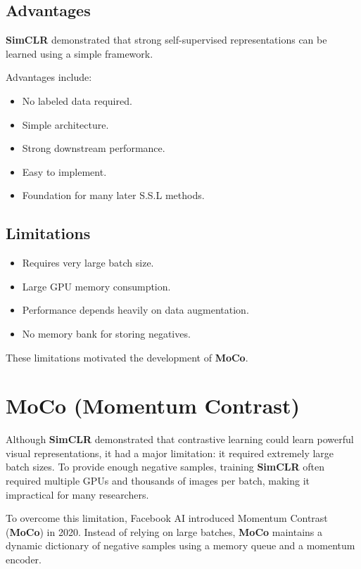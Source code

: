\subsection{Advantages}

\textbf{SimCLR} demonstrated that strong self-supervised representations can be learned using a simple framework.

Advantages include:
\begin{itemize}
    \item No labeled data required.
    \item Simple architecture.
    \item Strong downstream performance.
    \item Easy to implement.
    \item Foundation for many later S.S.L methods.
\end{itemize}

\subsection{Limitations}

\begin{itemize}
    \item Requires very large batch size.
    \item Large GPU memory consumption.
    \item Performance depends heavily on data augmentation.
    \item No memory bank for storing negatives.
\end{itemize}

These limitations motivated the development of \textbf{MoCo}.

\section{MoCo (Momentum Contrast)}

Although \textbf{SimCLR} demonstrated that contrastive learning could learn powerful visual representations, it had a major limitation: it required extremely large batch sizes. To provide enough negative samples, training \textbf{SimCLR} often required multiple GPUs and thousands of images per batch, making it impractical for many researchers.

To overcome this limitation, Facebook AI introduced Momentum Contrast (\textbf{MoCo}) in 2020. Instead of relying on large batches, \textbf{MoCo} maintains a dynamic dictionary of negative samples using a memory queue and a momentum encoder.

